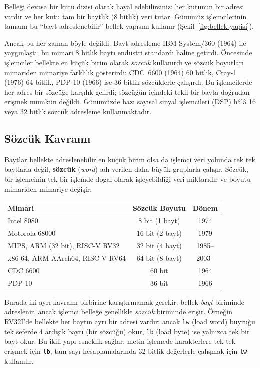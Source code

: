 Belleği devasa bir kutu dizisi olarak hayal edebilirsiniz: her kutunun bir adresi vardır ve her kutu tam bir baytlık (8 bitlik) veri tutar. Günümüz işlemcilerinin tamamı bu ``bayt adreslenebilir'' bellek yapısını kullanır (Şekil~\ref{fig:bellek-yapisi}).

Ancak bu her zaman böyle değildi. Bayt adresleme IBM System/360 (1964) ile yaygınlaştı; bu mimari 8 bitlik baytı endüstri standardı haline getirdi. Öncesinde işlemciler bellekte en küçük birim olarak \emph{sözcük} kullanırdı ve sözcük boyutları mimariden mimariye farklılık gösterirdi: CDC~6600 (1964) 60 bitlik, Cray-1 (1976) 64 bitlik, PDP-10 (1966) ise 36 bitlik sözcüklerle çalışırdı. Bu işlemcilerde her adres bir sözcüğe karşılık gelirdi; sözcüğün içindeki tekil bir bayta doğrudan erişmek mümkün değildi. Günümüzde bazı sayısal sinyal işlemcileri (DSP) hâlâ 16 veya 32 bitlik sözcük adresleme kullanmaktadır.

\subsection{Sözcük Kavramı}
Baytlar bellekte adreslenebilir en küçük birim olsa da işlemci veri yolunda tek tek baytlarla değil, \textbf{sözcük} (\emph{word}) adı verilen daha büyük gruplarla çalışır. Sözcük, bir işlemcinin tek bir işlemde doğal olarak işleyebildiği veri miktarıdır ve boyutu mimariden mimariye değişir:

\begin{center}
\small
\begin{tabular}{lcc}
\toprule
\textbf{Mimari} & \textbf{Sözcük Boyutu} & \textbf{Dönem} \\
\midrule
Intel 8080 & 8 bit (1 bayt) & 1974 \\
Motorola 68000 & 16 bit (2 bayt) & 1979 \\
MIPS, ARM (32 bit), RISC-V RV32 & 32 bit (4 bayt) & 1985-- \\
x86-64, ARM AArch64, RISC-V RV64 & 64 bit (8 bayt) & 2003-- \\
CDC 6600 & 60 bit & 1964 \\
PDP-10 & 36 bit & 1966 \\
\bottomrule
\end{tabular}
\end{center}

Burada iki ayrı kavramı birbirine karıştırmamak gerekir: bellek \emph{bayt} biriminde adreslenir, ancak işlemci belleğe genellikle \emph{sözcük} biriminde erişir. Örneğin RV32I'de bellekte her baytın ayrı bir adresi vardır; ancak \texttt{lw} (load word) buyruğu tek seferde 4 ardışık baytı (bir sözcüğü) okur, \texttt{lb} (load byte) ise yalnızca tek bir bayt okur. Bu ikili yapı esneklik sağlar: metin işlemede karakterlere tek tek erişmek için \texttt{lb}, tam sayı hesaplamalarında 32 bitlik değerlerle çalışmak için \texttt{lw} kullanılır.

